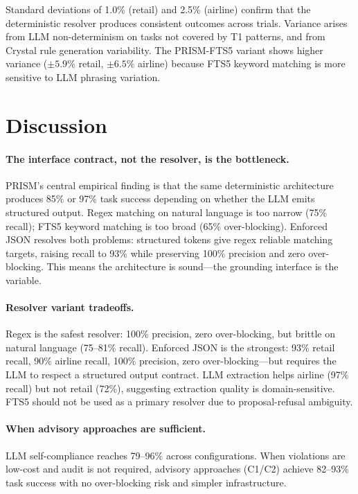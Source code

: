 \documentclass[11pt]{article}
\begin{document}
\noindent Standard deviations of 1.0\% (retail) and 2.5\% (airline) confirm
that the deterministic resolver produces consistent outcomes across trials.
Variance arises from LLM non-determinism on tasks not covered by
T1 patterns, and from Crystal rule generation variability.
The PRISM-FTS5 variant shows higher variance ($\pm 5.9\%$ retail,
$\pm 6.5\%$ airline) because FTS5 keyword matching is more sensitive
to LLM phrasing variation.

\section{Discussion}
\label{sec:discussion}

\paragraph{The interface contract, not the resolver, is the bottleneck.}
PRISM's central empirical finding is that the same deterministic architecture
produces 85\% or 97\% task success depending on whether the LLM emits
structured output.
Regex matching on natural language is too narrow (75\% recall);
FTS5 keyword matching is too broad (65\% over-blocking).
Enforced JSON resolves both problems: structured tokens give regex
reliable matching targets, raising recall to 93\% while preserving
100\% precision and zero over-blocking.
This means the architecture is sound---the grounding interface is the variable.

\paragraph{Resolver variant tradeoffs.}
Regex is the safest resolver: 100\% precision, zero over-blocking,
but brittle on natural language (75--81\% recall).
Enforced JSON is the strongest: 93\% retail recall, 90\% airline recall,
100\% precision, zero over-blocking---but requires the LLM to respect
a structured output contract.
LLM extraction helps airline (97\% recall) but not retail (72\%),
suggesting extraction quality is domain-sensitive.
FTS5 should not be used as a primary resolver due to
proposal-refusal ambiguity.

\paragraph{When advisory approaches are sufficient.}
LLM self-compliance reaches 79--96\% across configurations.
When violations are low-cost and audit is not required,
advisory approaches (C1/C2) achieve 82--93\% task success
with no over-blocking risk and simpler infrastructure.
\end{document}
